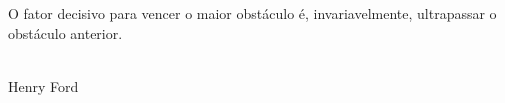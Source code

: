 %
%
\thispagestyle{empty}
\begin{epigrafe}


O fator decisivo para vencer o maior obstáculo é, invariavelmente, ultrapassar o obstáculo anterior.{\\}{\\}

\begin{autorepigrafe}
Henry Ford
\end{autorepigrafe}

\end{epigrafe}


